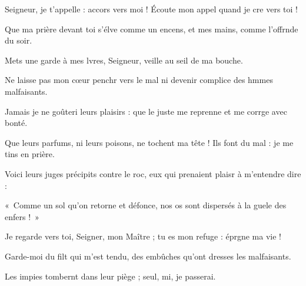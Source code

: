 \item Seigneur, je t’appelle : accors vers moi ! Écoute mon appel quand je cre vers toi !
\item Que ma prière devant toi s’élve comme un encens, et mes mains, comme l’offrnde du soir.
\item Mets une garde à mes lvres, Seigneur, veille au seil de ma bouche.
\item Ne laisse pas mon cœur penchr vers le mal ni devenir complice des hmmes malfaisants.
\item Jamais je ne goûteri leurs plaisirs : que le juste me reprenne et me corrge avec bonté.
\item Que leurs parfums, ni leurs poisons, ne tochent ma tête ! Ils font du mal : je me tins en prière.
\item Voici leurs juges précipits contre le roc, eux qui prenaient plaisr à m’entendre dire :
\item « Comme un sol qu’on retorne et défonce, nos os sont dispersés à la guele des enfers ! »
\item Je regarde vers toi, Seigner, mon Maître ; tu es mon refuge : éprgne ma vie !
\item Garde-moi du filt qui m’est tendu, des embûches qu’ont dresses les malfaisants.
\item Les impies tombernt dans leur piège ; seul, mi, je passerai.